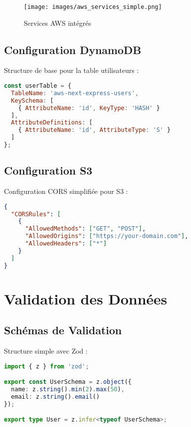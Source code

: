 \begin{figure}[H]
    \centering
    \texttt{[image: images/aws\_services\_simple.png]}
    \caption{Services AWS intégrés}
    \label{fig:aws_services}
\end{figure}

\subsection{Configuration DynamoDB}

Structure de base pour la table utilisateurs :

\begin{lstlisting}[language=javascript,caption=Table DynamoDB - Structure de base]
const userTable = {
  TableName: 'aws-next-express-users',
  KeySchema: [
    { AttributeName: 'id', KeyType: 'HASH' }
  ],
  AttributeDefinitions: [
    { AttributeName: 'id', AttributeType: 'S' }
  ]
};
\end{lstlisting}

\subsection{Configuration S3}

Configuration CORS simplifiée pour S3 :

\begin{lstlisting}[language=json,caption=Configuration CORS S3]
{
  "CORSRules": [
    {
      "AllowedMethods": ["GET", "POST"],
      "AllowedOrigins": ["https://your-domain.com"],
      "AllowedHeaders": ["*"]
    }
  ]
}
\end{lstlisting}

\section{Validation des Données}

\subsection{Schémas de Validation}

Structure simple avec Zod :

\begin{lstlisting}[language=typescript,caption=Validation utilisateur]
import { z } from 'zod';

export const UserSchema = z.object({
  name: z.string().min(2).max(50),
  email: z.string().email()
});

export type User = z.infer<typeof UserSchema>;
\end{lstlisting}

